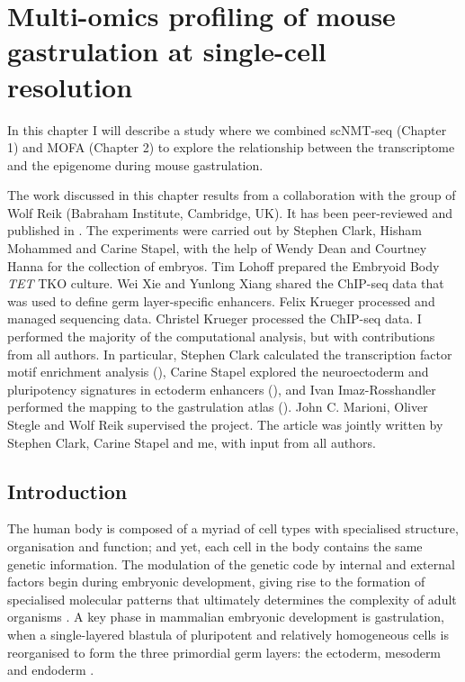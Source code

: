 \graphicspath{{Chapter3/Figs/}}

\chapter{Multi-omics profiling of mouse gastrulation at single-cell resolution}

In this chapter I will describe a study where we combined scNMT-seq (Chapter 1) and MOFA (Chapter 2) to explore the relationship between the transcriptome and the epigenome during mouse gastrulation.

The work discussed in this chapter results from a collaboration with the group of Wolf Reik (Babraham Institute, Cambridge, UK). It has been peer-reviewed and published in \cite{Argelaguet2019}. The experiments were carried out by Stephen Clark, Hisham Mohammed and Carine Stapel, with the help of Wendy Dean and Courtney Hanna for the collection of embryos. Tim Lohoff prepared the Embryoid Body \textit{TET} TKO culture. Wei Xie and Yunlong Xiang shared the ChIP-seq data that was used to define germ layer-specific enhancers. Felix Krueger processed and managed sequencing data. Christel Krueger processed the ChIP-seq data. I performed the majority of the computational analysis, but with contributions from all authors. In particular, Stephen Clark calculated the transcription factor motif enrichment analysis (), Carine Stapel explored the neuroectoderm and pluripotency signatures in ectoderm enhancers (), and Ivan Imaz-Rosshandler performed the mapping to the gastrulation atlas (). John C. Marioni, Oliver Stegle and Wolf Reik supervised the project. The article was jointly written by Stephen Clark, Carine Stapel and me, with input from all authors.

\section{Introduction}

The human body is composed of a myriad of cell types with specialised structure, organisation and function; and yet, each cell in the body contains the same genetic information. The modulation of the genetic code by internal and external factors begin during embryonic development, giving rise to the formation of specialised molecular patterns that ultimately determines the complexity of adult organisms \cite{Rosalind2018}. A key phase in mammalian embryonic development is gastrulation, when a single-layered blastula of pluripotent and relatively homogeneous cells is reorganised to form the three primordial germ layers: the ectoderm, mesoderm and endoderm \cite{Tam1997, Solnica-Krezel2012, Tam2007}.

